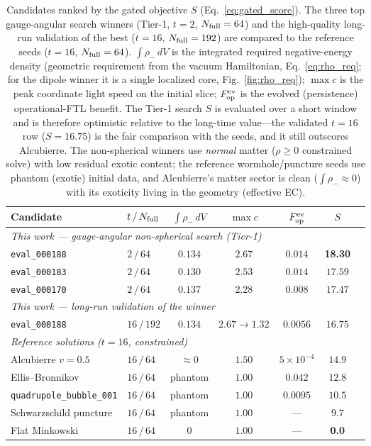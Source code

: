 \documentclass[twocolumn,floatfix,aps,prd,nofootinbib]{revtex4-2}
\begin{document}
\begin{table}[t]
\caption{Candidates ranked by the gated objective $S$ (Eq.~\ref{eq:gated_score}).  The three top gauge-angular search winners (Tier-1, $t=2$, $N_{\rm full}=64$) and the high-quality long-run validation of the best ($t=16$, $N_{\rm full}=192$) are compared to the reference seeds ($t=16$, $N_{\rm full}=64$).  $\int\rho_-\,dV$ is the integrated required negative-energy density (geometric requirement from the vacuum Hamiltonian, Eq.~\ref{eq:rho_req}; for the dipole winner it is a single localized core, Fig.~\ref{fig:rho_req}); $\max c$ is the peak coordinate light speed on the initial slice; $F_{\rm op}^{\rm ev}$ is the evolved (persistence) operational-FTL benefit.  The Tier-1 search $S$ is evaluated over a short window and is therefore optimistic relative to the long-time value---the validated $t=16$ row ($S=16.75$) is the fair comparison with the seeds, and it still outscores Alcubierre.  The non-spherical winners use \emph{normal} matter ($\rho\ge0$ constrained solve) with low residual exotic content; the reference wormhole/puncture seeds use phantom (exotic) initial data, and Alcubierre's matter sector is clean ($\int\rho_-\approx0$) with its exoticity living in the geometry (effective EC).}
\label{tab:score_comparison}
\small
\begin{ruledtabular}
\begin{tabular}{llccccc}
Candidate & $t\,/\,N_{\rm full}$ & $\int\rho_-\,dV$ & $\max c$ & $F_{\rm op}^{\rm ev}$ & $S$ \\
\hline
\multicolumn{6}{l}{\textit{This work --- gauge-angular non-spherical search (Tier-1)}}\\
\texttt{eval\_000188} & $2\,/\,64$ & $0.134$ & $2.67$ & $0.014$ & \textbf{18.30}\\
\texttt{eval\_000183} & $2\,/\,64$ & $0.130$ & $2.53$ & $0.014$ & $17.59$\\
\texttt{eval\_000170} & $2\,/\,64$ & $0.137$ & $2.28$ & $0.008$ & $17.47$\\
\hline
\multicolumn{6}{l}{\textit{This work --- long-run validation of the winner}}\\
\texttt{eval\_000188} & $16\,/\,192$ & $0.134$ & $2.67\!\to\!1.32$ & $0.0056$ & $16.75$\\
\hline
\multicolumn{6}{l}{\textit{Reference solutions ($t=16$, constrained)}}\\
Alcubierre $v=0.5$ & $16\,/\,64$ & $\approx0$ & $1.50$ & $5\times10^{-4}$ & $14.9$\\
Ellis--Bronnikov & $16\,/\,64$ & phantom & $1.00$ & $0.042$ & $12.8$\\
\texttt{quadrupole\_bubble\_001} & $16\,/\,64$ & phantom & $1.00$ & $0.0095$ & $10.5$\\
Schwarzschild puncture & $16\,/\,64$ & phantom & $1.00$ & --- & $9.7$\\
Flat Minkowski & $16\,/\,64$ & $0$ & $1.00$ & --- & \textbf{0.0}\\
\end{tabular}
\end{ruledtabular}
\end{table}
\end{document}
